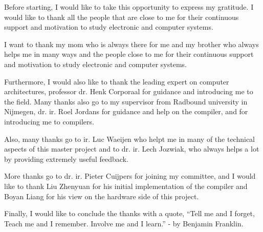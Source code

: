 Before starting, I would like to take this opportunity to express my gratitude. I would like to thank all the people that are close to me for their continuous support and motivation to study electronic and computer systems.

I want to thank my mom who is always there for me and my brother who always helps me in many ways and the people close to me for their continuous support and motivation to study electronic and computer systems.

Furthermore, I would also like to thank the leading expert on computer architectures, professor dr. Henk Corporaal for guidance and introducing me to the field. %
Many thanks also go to my supervisor from Radbound university in Nijmegen, dr. ir. Roel Jordans for guidance and help on the compiler, and for introducing me to compilers.

Also, many thanks go to ir. Luc Waeijen who helpt me in many of the technical aspects of this master project and to dr. ir. Lech Jozwiak, who always helps a lot by providing extremely useful feedback.

More thanks go to dr. ir. Pieter Cuijpers for joining my committee, and I would like to thank Liu Zhenyuan for his initial implementation of the compiler and Boyan Liang for his view on the hardware side of this project.

Finally, I would like to conclude the thanks with a quote, ``Tell me and I forget, Teach me and I remember. Involve me and I learn.'' - by Benjamin Franklin.



